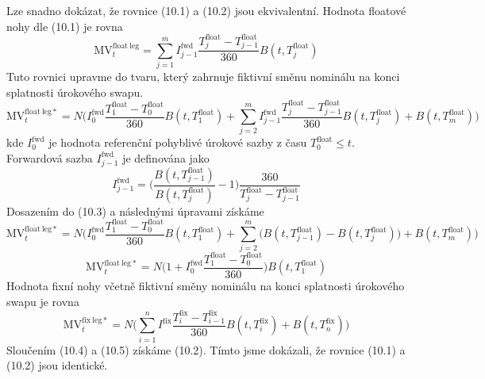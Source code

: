 \documentclass[a4paper]{book}
\begin{document}
Lze snadno dokázat, že rovnice (10.1) a (10.2) jsou ekvivalentní. Hodnota floatové nohy dle (10.1) je rovna
\begin{equation*}
\mathrm{MV}_t^{\mathrm{float~leg}} = \sum_{j=1}^m I_{j-1}^{\mathrm{fwd}} \frac{T_j^{\mathrm{float}}-T_{j-1}^{\mathrm{float}}}{360}B(t,T_j^{\mathrm{float}})
\end{equation*}
Tuto rovnici upravme do tvaru, který zahrnuje fiktivní směnu nominálu na konci splatnosti úrokového swapu.
\begin{equation}
\mathrm{MV}_t^{\mathrm{float~leg*}} = N \Bigg(I_0^{\mathrm{fwd}} \frac{T_1^{\mathrm{float}}-T_0^{\mathrm{float}}}{360}B(t,T_1^{\mathrm{float}}) + \sum_{j=2}^m I_{j-1}^{\mathrm{fwd}} \frac{T_j^{\mathrm{float}}-T_{j-1}^{\mathrm{float}}}{360}B(t,T_j^{\mathrm{float}}) + B(t,T_m^{\mathrm{float}}) \Bigg)
\end{equation}
kde $I_0^{\mathrm{fwd}}$ je hodnota referenční pohyblivé úrokové sazby z času $T_0^{\mathrm{float}} \le t$. Forwardová sazba $I_{j-1}^{\mathrm{fwd}}$ je definována jako
\begin{equation*}
I_{j-1}^{\mathrm{fwd}} = \Bigg( \frac{B(t,T_{j-1}^{\mathrm{float}})}{B(t,T_j^{\mathrm{float}})} - 1 \Bigg) \frac{360}{T_j^{\mathrm{float}} - T_{j-1}^{\mathrm{float}}}
\end{equation*}
Dosazením do (10.3) a následnými úpravami získáme
\begin{equation*}
\mathrm{MV}_t^{\mathrm{float~leg*}} = N \Bigg(I_0^{\mathrm{fwd}} \frac{T_1^{\mathrm{float}} - T_0^{\mathrm{float}}}{360}B(t,T_1^{\mathrm{float}}) + \sum_{j=2}^m \Big( B(t,T_{j-1}^{\mathrm{float}}) - B(t,T_j^{\mathrm{float}}) \Big) + B(t,T_m^{\mathrm{float}}) \Bigg)
\end{equation*}
\begin{equation}
\mathrm{MV}_t^{\mathrm{float~leg*}} = N \Bigg(1 + I_0^{\mathrm{fwd}} \frac{T_1^{\mathrm{float}} - T_0^{\mathrm{float}}}{360} \Bigg)B(t,T_1^{\mathrm{float}})
\end{equation}
Hodnota fixní nohy včetně fiktivní směny nominálu na konci splatnosti úrokového swapu je rovna
\begin{equation}
\mathrm{MV}_t^{\mathrm{fix~leg*}} = N \Bigg( \sum_{i=1}^n I^{\mathrm{fix}} \frac{T_i^{\mathrm{fix}}-T_{i-1}^{\mathrm{fix}}}{360}B(t,T_i^{\mathrm{fix}}) +  B(t,T_n^{\mathrm{fix}})\Bigg)
\end{equation}
Sloučením (10.4) a (10.5) získáme (10.2). Tímto jsme dokázali, že rovnice (10.1) a (10.2) jsou identické.
\end{document}
